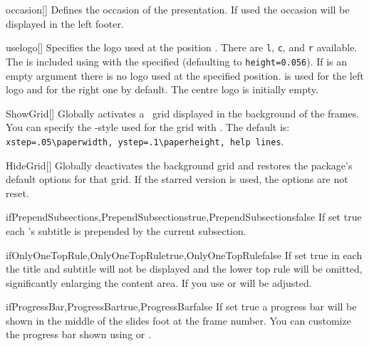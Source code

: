 \begin{describemacro}{occasion}[]
  Defines the occasion of the presentation. If used the occasion will be
  displayed in the left footer.
\end{describemacro}

\begin{describemacro}{uselogo}[]
  Specifies the logo used at the position . There are \texttt{l},
  \texttt{c}, and \texttt{r} available. The  is included using
   with the specified  (defaulting to
  \texttt{height=0.056}). If  is an empty argument
  there is no logo used at the specified position.
   is used for the left logo and
   for the right one by default. The centre
  logo is initially empty.
\end{describemacro}

\begin{describemacro}{ShowGrid}[]
  Globally activates a \TikZ\ grid displayed in the background of the frames.
  You can specify the \TikZ-style used for the grid with . The
  default is: \verb|xstep=.05\paperwidth, ystep=.1\paperheight, help lines|.
\end{describemacro}

\begin{describemacro}{HideGrid}[\meta{*}]
  Globally deactivates the background grid and restores the package's default
  options for that grid. If the starred version is used, the options are not
  reset.
\end{describemacro}

\begin{describemacro}
  {ifPrependSubsections,PrependSubsectionstrue,PrependSubsectionsfalse}
  If set true each 's subtitle is prepended by the current
  subsection.
\end{describemacro}

\begin{describemacro}{ifOnlyOneTopRule,OnlyOneTopRuletrue,OnlyOneTopRulefalse}
  If set true in each  the title and subtitle will not be displayed
  and the lower top rule will be omitted, significantly enlarging the content
  area. If you use  or 
   will be adjusted.
\end{describemacro}

\begin{describemacro}{ifProgressBar,ProgressBartrue,ProgressBarfalse}
  If set true a progress bar will be shown in the middle of the slides foot at
  the frame number. You can customize the progress bar shown using
   or .
\end{describemacro}


